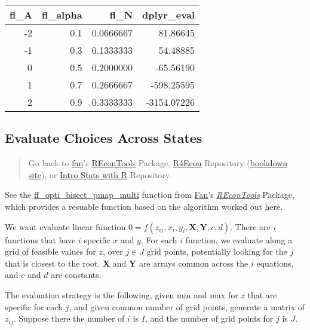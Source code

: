 \documentclass[
]{book}
\begin{document}
\begin{table}[!h]
\centering
\begin{tabular}{r|r|r|r}
\hline
fl\_A & fl\_alpha & fl\_N & dplyr\_eval\\
\hline
\rowcolor{gray!6}  -2 & 0.1 & 0.0666667 & 81.86645\\
\hline
-1 & 0.3 & 0.1333333 & 54.48885\\
\hline
\rowcolor{gray!6}  0 & 0.5 & 0.2000000 & -65.56190\\
\hline
1 & 0.7 & 0.2666667 & -598.25595\\
\hline
\rowcolor{gray!6}  2 & 0.9 & 0.3333333 & -3154.07226\\
\hline
\end{tabular}
\end{table}

\hypertarget{evaluate-choices-across-states}{%
\subsection{Evaluate Choices Across States}\label{evaluate-choices-across-states}}

\begin{quote}
Go back to \href{http://fanwangecon.github.io/CodeDynaAsset/}{fan}'s \href{https://fanwangecon.github.io/REconTools/}{REconTools} Package, \href{https://fanwangecon.github.io/R4Econ/}{R4Econ} Repository (\href{https://fanwangecon.github.io/R4Econ/bookdown}{bookdown site}), or \href{https://fanwangecon.github.io/Stat4Econ/}{Intro Stats with R} Repository.
\end{quote}

See the \href{https://fanwangecon.github.io/REconTools/reference/ff_opti_bisect_pmap_multi.html}{ff\_opti\_bisect\_pmap\_multi} function from \href{https://fanwangecon.github.io/}{Fan}'s \emph{\href{https://fanwangecon.github.io/REconTools/}{REconTools}} Package, which provides a resuable function based on the algorithm worked out here.

We want evaluate linear function \(0=f(z_{ij}, x_i, y_i, \textbf{X}, \textbf{Y}, c, d)\). There are \(i\) functions that have \(i\) specific \(x\) and \(y\). For each \(i\) function, we evaluate along a grid of feasible values for \(z\), over \(j\in J\) grid points, potentially looking for the \(j\) that is closest to the root. \(\textbf{X}\) and \(\textbf{Y}\) are arrays common across the \(i\) equations, and \(c\) and \(d\) are constants.

The evaluation strategy is the following, given min and max for \(z\) that are specific for each \(j\), and given common number of grid points, generate a matrix of \(z_{ij}\). Suppose there the number of \(i\) is \(I\), and the number of grid points for \(j\) is \(J\).
\end{document}
